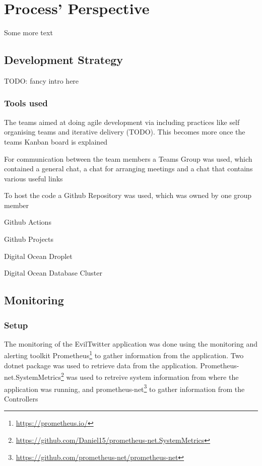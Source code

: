 \documentclass[report/main.tex]{subfiles}
\begin{document}
    \section{Process' Perspective}
    \label{Sec:process_perspective}
        Some more text
        
        \subsection{Development Strategy}
            TODO: fancy intro here
            
            \subsubsection{Tools used}
                The teams aimed at doing agile development via including practices like self organising teams and iterative delivery (TODO). This becomes more once the teams Kanban board is explained
            
                For communication between the team members a Teams Group was used, which contained a general chat, a chat for arranging meetings and a chat that contains various useful links
                
                To host the code a Github Repository was used, which was owned by one group member
                
                Github Actions
                
                Github Projects
                
                Digital Ocean Droplet
                
                Digital Ocean Database Cluster
                
            
        \subsection{Monitoring}
            \subsubsection{Setup}
                The monitoring of the EvilTwitter application was done using the monitoring and alerting toolkit Prometheus\footnote{\hyperlink{https://prometheus.io/}{https://prometheus.io/}} to gather information from the application. Two dotnet package was used to retrieve data from the application. Prometheus-net.SystemMetrics\footnote{\hyperlink{https://github.com/Daniel15/prometheus-net.SystemMetrics}{https://github.com/Daniel15/prometheus-net.SystemMetrics}} was used to retreive system information from where the application was running, and prometheus-net\footnote{\hyperlink{https://github.com/prometheus-net/prometheus-net}{https://github.com/prometheus-net/prometheus-net}} to gather information from the Controllers
                
\end{document}
